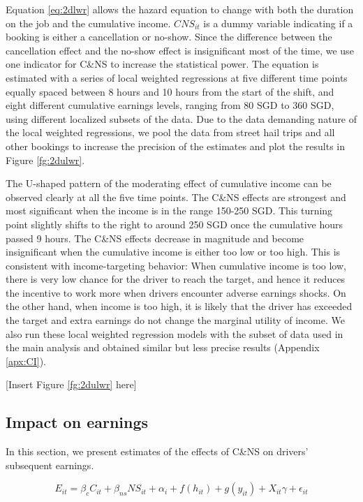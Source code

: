\documentclass[reviewmode,AEJ]{AEA}
\begin{document}
Equation \eqref{eq:2dlwr} allows the hazard equation to change with both the duration on the job and the cumulative income. $CNS_{it}$ is a dummy variable indicating if a booking is either a cancellation or no-show.  Since the difference between the cancellation effect and the no-show effect is insignificant most of the time, we 
use one indicator for C\&NS to increase the statistical power. The equation is estimated with a series of local weighted regressions at five different time points equally spaced between 8 hours and 10 hours from the start of the shift, and eight different cumulative earnings levels, ranging from 80 SGD to 360 SGD, using different localized subsets of the data.  
Due to the data demanding nature of the local weighted regressions, we  pool the data from street hail trips and all other bookings to increase the precision of the estimates and plot the results in Figure \ref{fg:2dulwr}.

The U-shaped pattern of the moderating effect of cumulative income can be observed clearly at all the five time points. The C\&NS effects are strongest and most significant when the income is in the range 150-250 SGD. This turning point slightly shifts to the right to around 250 SGD once the cumulative hours passed 9 hours. The C\&NS effects decrease in magnitude and become insignificant when the cumulative income is either too low or too high. This is consistent with income-targeting behavior: When cumulative income is too low, there is very low chance for the driver to reach the target, and hence it reduces the incentive to work more when drivers encounter adverse earnings shocks. On the other hand, when income is too high, it is likely that the driver has exceeded the target and extra earnings do not change the marginal utility of income. We also run these local weighted regression models with the subset of data used in the main analysis and obtained similar but less precise results (Appendix \ref{apx:CI}).


\begin{center}
	[Insert Figure \ref{fg:2dulwr} here]
\end{center}

\subsection{Impact on earnings}
In this section, we present estimates of the effects of C\&NS on drivers' subsequent earnings.

\begin{equation}
\label{eq:outcomes}
E_{it} = \beta_c C_{it} + \beta_{ns} {NS}_{it} + \alpha_i + f(h_{it}) + g(y_{it}) + X_{it}\gamma  + \epsilon_{it}
\end{equation}
\end{document}
